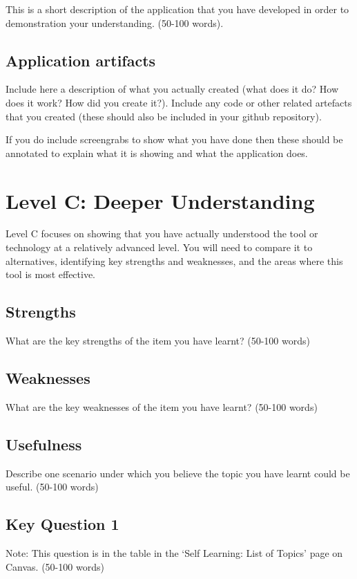 \documentclass[a4paper, 11pt]{report}
\begin{document}
This is a short description of the application that you have developed in order to demonstration your understanding. (50-100 words).

\subsection{Application artifacts}

Include here a description of what you actually created (what does it do? How does it work? How did you create it?). Include any code or other related artefacts that you created (these should also be included in your github repository).

If you do include screengrabs to show what you have done then these should be annotated to explain what it is showing and what the application does.



\newpage
\section{Level C: Deeper Understanding}

Level C focuses on showing that you have actually understood the tool or technology at a relatively advanced level. You will need to compare it to alternatives, identifying key strengths and weaknesses, and the areas where this tool is most effective. 

\subsection{Strengths}
What are the key strengths of the item you have learnt? (50-100 words)

\subsection{Weaknesses}
What are the key weaknesses of the item you have learnt? (50-100 words)

\subsection{Usefulness}
Describe one scenario under which you believe the topic you have learnt could be useful. (50-100 words)

\subsection{Key Question 1}
Note: This question is in the table in the ‘Self Learning: List of Topics’ page on Canvas. (50-100 words)
\end{document}
